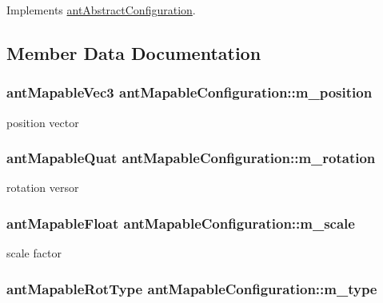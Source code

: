 Implements \hyperlink{classant_abstract_configuration}{ant\+Abstract\+Configuration}.



\subsection{Member Data Documentation}
\hypertarget{classant_mapable_configuration_aa6407ddaead7f445d696d91ab7c736ed}{
\subsubsection[{m\+\_\+position}]{\setlength{\rightskip}{0pt plus 5cm}ant\+Mapable\+Vec3 ant\+Mapable\+Configuration\+::m\+\_\+position\hspace{0.3cm}{\ttfamily [private]}}}\label{classant_mapable_configuration_aa6407ddaead7f445d696d91ab7c736ed}
position vector \hypertarget{classant_mapable_configuration_a14ba37effab1c8341a75c6362cd2def4}{
\subsubsection[{m\+\_\+rotation}]{\setlength{\rightskip}{0pt plus 5cm}ant\+Mapable\+Quat ant\+Mapable\+Configuration\+::m\+\_\+rotation\hspace{0.3cm}{\ttfamily [private]}}}\label{classant_mapable_configuration_a14ba37effab1c8341a75c6362cd2def4}
rotation versor \hypertarget{classant_mapable_configuration_af0954326d95c30af4f04c473fc830569}{
\subsubsection[{m\+\_\+scale}]{\setlength{\rightskip}{0pt plus 5cm}ant\+Mapable\+Float ant\+Mapable\+Configuration\+::m\+\_\+scale\hspace{0.3cm}{\ttfamily [private]}}}\label{classant_mapable_configuration_af0954326d95c30af4f04c473fc830569}
scale factor \hypertarget{classant_mapable_configuration_abf6ce9445acae576092246c9bfeade86}{
\subsubsection[{m\+\_\+type}]{\setlength{\rightskip}{0pt plus 5cm}ant\+Mapable\+Rot\+Type ant\+Mapable\+Configuration\+::m\+\_\+type\hspace{0.3cm}{\ttfamily [private]}}}\label{classant_mapable_configuration_abf6ce9445acae576092246c9bfeade86}
